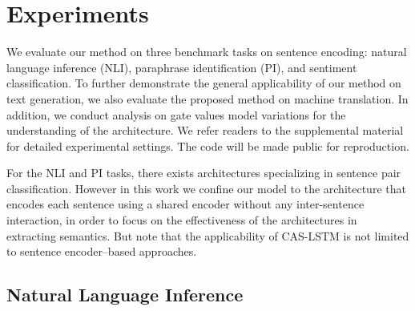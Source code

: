 \documentclass[wcp]{jmlr}
\begin{document}
    
    \section{Experiments}
    \label{sec:experiments}
    We evaluate our method on three benchmark tasks on sentence encoding: natural language inference (NLI), paraphrase identification (PI), and sentiment classification.
    To further demonstrate the general applicability of our method on text generation, we also evaluate the proposed method on machine translation.
    In addition, we conduct analysis on gate values model variations for the understanding of the architecture.
    We refer readers to the supplemental material for detailed experimental settings.
    The code will be made public for reproduction.
    
    For the NLI and PI tasks, there exists architectures specializing in sentence pair classification.
    However in this work we confine our model to the architecture that encodes each sentence using a shared encoder without any inter-sentence interaction, in order to focus on the effectiveness of the architectures in extracting semantics.
    But note that the applicability of CAS-LSTM is not limited to sentence encoder--based approaches.
    
    \subsection{Natural Language Inference}
    
\end{document}
